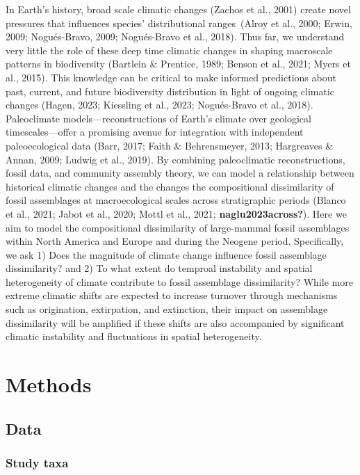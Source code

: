\documentclass[
]{agujournal2019}
\begin{document}
In Earth's history, broad scale climatic changes (Zachos et al., 2001)
create novel pressures that influences species' distributional
ranges~(Alroy et al., 2000; Erwin, 2009; Nogués-Bravo, 2009;
Nogués-Bravo et al., 2018). Thus far, we understand very little the role
of these deep time climatic changes in shaping macroscale patterns in
biodiversity (Bartlein \& Prentice, 1989; Benson et al., 2021; Myers et
al., 2015). This knowledge can be critical to make informed predictions
about past, current, and future biodiversity distribution in light of
ongoing climatic changes (Hagen, 2023; Kiessling et al., 2023;
Nogués-Bravo et al., 2018). Paleoclimate models---reconstructions of
Earth's climate over geological timescales---offer a promising avenue
for integration with independent paleoecological data (Barr, 2017; Faith
\& Behrensmeyer, 2013; Hargreaves \& Annan, 2009; Ludwig et al., 2019).
By combining paleoclimatic reconstructions, fossil data, and community
assembly theory, we can model a relationship between historical climatic
changes and the changes the compositional dissimilarity of fossil
assemblages at macroecological scales across stratigraphic periods
(Blanco et al., 2021; Jabot et al., 2020; Mottl et al., 2021;
\textbf{naglu2023across?}). Here we aim to model the compositional
dissimilarity of large-mammal fossil assemblages within North America
and Europe and during the Neogene period. Specifically, we ask 1) Does
the magnitude of climate change influence fossil assemblage
dissimilarity? and 2) To what extent do temproal instability and spatial
heterogeneity of climate contribute to fossil assemblage dissimilarity?
While more extreme climatic shifts are expected to increase turnover
through mechanisms such as origination, extirpation, and extinction,
their impact on assemblage dissimilarity will be amplified if these
shifts are also accompanied by significant climatic instability and
fluctuations in spatial heterogeneity.

\section{Methods}\label{methods}

\subsection{Data}\label{data}

\subsubsection{Study taxa}\label{study-taxa}
\end{document}
